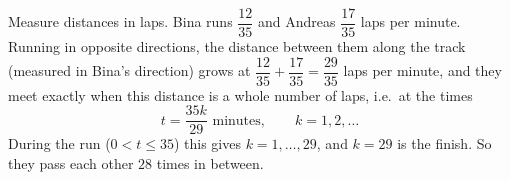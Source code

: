 Measure distances in laps. Bina runs $\dfrac{12}{35}$ and Andreas $\dfrac{17}{35}$ laps per minute. Running in opposite directions, the distance between them along the track (measured in Bina's direction) grows at $\dfrac{12}{35}+\dfrac{17}{35}=\dfrac{29}{35}$ laps per minute, and they meet exactly when this distance is a whole number of laps, i.e.\ at the times
\[
t=\dfrac{35k}{29}\text{ minutes},\qquad k=1,2,\dots
\]
During the run ($0<t\le35$) this gives $k=1,\dots,29$, and $k=29$ is the finish. So they pass each other $\boxed{28}$ times in between.
